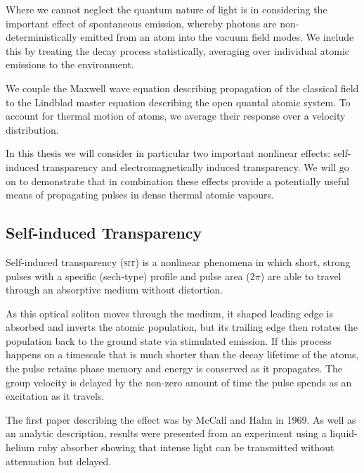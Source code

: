     Where we cannot neglect the quantum nature of light is in considering the
    important effect of spontaneous emission, whereby photons are non-
    deterministically emitted from an atom into the vacuum field modes. We
    include this by treating the decay process statistically, averaging over
    individual atomic emissions to the environment.\cite{loudon2000quantum}

    We couple the Maxwell wave equation describing propagation of the classical
    field to the Lindblad master equation describing the open quantal atomic
    system. To account for thermal motion of atoms, we average their response
    over a velocity distribution.\cite{foot2005atomic}

    In this thesis we will consider in particular two important nonlinear
    effects: self-induced transparency and electromagnetically induced
    transparency. We will go on to demonstrate that in combination these effects
    provide a potentially useful means of propagating pulses in dense thermal
    atomic vapours.


  \subsection*{Self-induced Transparency}

    Self-induced transparency (\textsc{sit}) is a nonlinear phenomena in which
    short, strong pulses with a specific (sech-type) profile and pulse area
    ($2\pi$) are able to travel through an absorptive medium without
    distortion.

    As this optical soliton moves through the medium, it shaped leading edge
    is absorbed and inverts the atomic population, but its trailing edge then
    rotates the population back to the ground state via stimulated
    emission.\cite{allen1975optical} If this process happens on a timescale that
    is much shorter than the decay lifetime of the atoms, the pulse retains
    phase memory and energy is conserved as it propagates. The group velocity is
    delayed by the non-zero amount of time the pulse spends as an excitation as
    it travels.

    The first paper describing the effect was by McCall and Hahn in
    1969.\cite{McCall1969} As well as an analytic description, results were
    presented from an experiment using a liquid-helium ruby absorber showing
    that intense light can be transmitted without attenuation but delayed.

